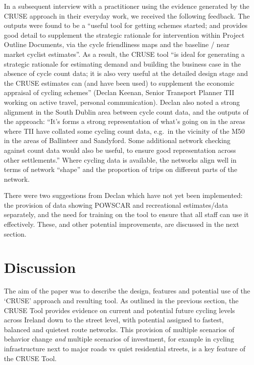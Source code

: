 \documentclass[
  super,
  preprint,
  3p]{elsarticle}
\begin{document}
In a subsequent interview with a practitioner using the evidence
generated by the CRUSE approach in their everyday work, we received the
following feedback. The outputs were found to be a ``useful tool for
getting schemes started; and provides good detail to supplement the
strategic rationale for intervention within Project Outline Documents,
via the cycle friendliness maps and the baseline / near market cyclist
estimates''. As a result, the CRUSE tool ``is ideal for generating a
strategic rationale for estimating demand and building the business case
in the absence of cycle count data; it is also very useful at the
detailed design stage and the CRUSE estimates can (and have been used)
to supplement the economic appraisal of cycling schemes'' (Declan
Keenan, Senior Transport Planner TII working on active travel, personal
communication). Declan also noted a strong alignment in the South Dublin
area between cycle count data, and the outputs of the approach: ``It's
forms a strong representation of what's going on in the areas where TII
have collated some cycling count data, e.g.~in the vicinity of the M50
in the areas of Ballinteer and Sandyford. Some additional network
checking against count data would also be useful, to ensure good
representation across other settlements.'' Where cycling data is
available, the networks align well in terms of network ``shape'' and the
proportion of trips on different parts of the network.

There were two suggestions from Declan which have not yet been
implemented: the provision of data showing POWSCAR and recreational
estimates/data separately, and the need for training on the tool to
ensure that all staff can use it effectively. These, and other potential
improvements, are discussed in the next section.

\section{Discussion}\label{sec-discussion}

The aim of the paper was to describe the design, features and potential
use of the `CRUSE' approach and resulting tool. As outlined in the
previous section, the CRUSE Tool provides evidence on current and
potential future cycling levels across Ireland down to the street level,
with potential assigned to fastest, balanced and quietest route
networks. This provision of multiple scenarios of behavior change
\emph{and} multiple scenarios of investment, for example in cycling
infrastructure next to major roads vs quiet residential streets, is a
key feature of the CRUSE Tool.
\end{document}
